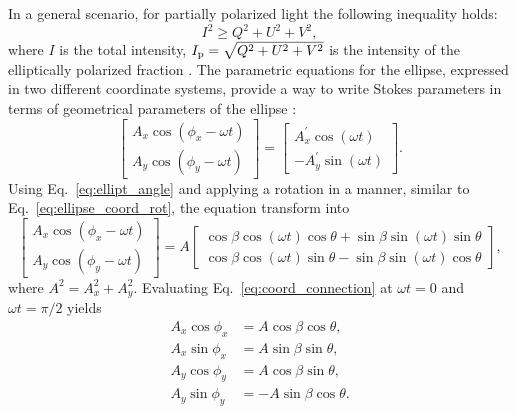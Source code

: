 In a general scenario, for partially polarized light the following inequality holds:
\begin{equation}
    I ^ 2 \ge Q^2 + U^2 + V^2,
\end{equation}
where $I$ is the total intensity, $I_{\mathrm{p}} = \sqrt{Q^2 + U^2 + V^2}$ is the intensity of the elliptically polarized fraction \citep{Stokes1851}.
The parametric equations for the ellipse, expressed in two different coordinate systems, provide a way to write Stokes parameters in terms of geometrical parameters of the ellipse \citep{RadiationProcesses}:
\begin{equation}
    \begin{bmatrix}
        A_x \cos(\phi_x - \omega t) \\
        A_y \cos(\phi_y - \omega t)
    \end{bmatrix} =
    \begin{bmatrix}
        A_x^\prime \cos (\omega t) \\
        - A_y^\prime \sin (\omega t)
    \end{bmatrix}.
\end{equation}
Using Eq.~\ref{eq:ellipt_angle} and applying a rotation in a manner, similar to Eq.~\ref{eq:ellipse_coord_rot}, the equation transform into
\begin{equation}
    \label{eq:coord_connection}
    \begin{bmatrix}
        A_x \cos(\phi_x - \omega t) \\
        A_y \cos(\phi_y - \omega t)
    \end{bmatrix} = A
    \begin{bmatrix}
        \cos\beta\cos(\omega t)\cos\theta + \sin \beta \sin (\omega t) \sin\theta \\
        \cos\beta\cos(\omega t)\sin\theta - \sin\beta\sin(\omega t)\cos\theta
    \end{bmatrix},
\end{equation}
where $A^2 = A_x^2 + A_y^2$.
Evaluating Eq.~\ref{eq:coord_connection} at $\omega t = 0$ and $\omega t = \pi / 2$ yields
\begin{equation}
    \begin{aligned}
    A_x \cos\phi_x & = A \cos\beta\cos\theta, \\
    A_x \sin\phi_x & = A \sin\beta\sin\theta, \\
    A_y \cos\phi_y & = A \cos\beta\sin\theta, \\
    A_y \sin\phi_y & = -A \sin\beta\cos\theta.
    \end{aligned}
\end{equation}
